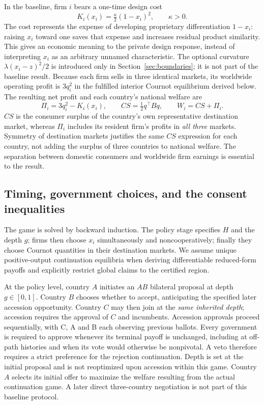 \documentclass[11pt,a4paper]{article}
\theoremstyle{remark}\newtheorem{remark}[theorem]{Remark}
\begin{document}
In the baseline, firm $i$ bears a one-time design cost
\begin{equation}\label{eq:cost}
K_i(x_i)=\tfrac{\kappa}{2}(1-x_i)^2,\qquad\kappa>0.
\end{equation}
The cost represents the expense of developing proprietary differentiation $1-x_i$: raising $x_i$ toward one saves that expense and increases residual product similarity. This gives an economic meaning to the private design response, instead of interpreting $x_i$ as an arbitrary unnamed characteristic. The optional curvature $\lambda(x_i-z)^2/2$ is introduced only in Section~\ref{sec:boundaries}; it is not part of the baseline result. Because each firm sells in three identical markets, its worldwide operating profit is $3q_i^2$ in the fulfilled interior Cournot equilibrium derived below. The resulting net profit and each country's national welfare are
\begin{equation}\label{eq:welfare}
\Pi_i=3q_i^2-K_i(x_i),\qquad CS=\tfrac12q^{\top}Bq,\qquad W_i=CS+\Pi_i.
\end{equation}
$CS$ is the consumer surplus of the country's own representative destination market, whereas $\Pi_i$ includes its resident firm's profits in \emph{all three} markets. Symmetry of destination markets justifies the same $CS$ expression for each country, not adding the surplus of three countries to national welfare. The separation between domestic consumers and worldwide firm earnings is essential to the result.

\subsection{Timing, government choices, and the consent inequalities}
The game is solved by backward induction. The policy stage specifies $H$ and the depth $g$; firms then choose $x_i$ simultaneously and noncooperatively; finally they choose Cournot quantities in their destination markets. We assume unique positive-output continuation equilibria when deriving differentiable reduced-form payoffs and explicitly restrict global claims to the certified region.

At the policy level, country $A$ initiates an $AB$ bilateral proposal at depth $g\in[0,1]$. Country $B$ chooses whether to accept, anticipating the specified later accession opportunity. Country $C$ may then join at the \emph{same inherited depth}; accession requires the approval of $C$ and incumbents. Accession approvals proceed sequentially, with C, A and B each observing previous ballots. Every government is required to approve whenever its terminal payoff is unchanged, including at off-path histories and when its vote would otherwise be nonpivotal. A veto therefore requires a strict preference for the rejection continuation. Depth is set at the initial proposal and is not reoptimized upon accession within this game. Country $A$ selects its initial offer to maximize the welfare resulting from the actual continuation game. A later direct three-country negotiation is not part of this baseline protocol.
\end{document}
